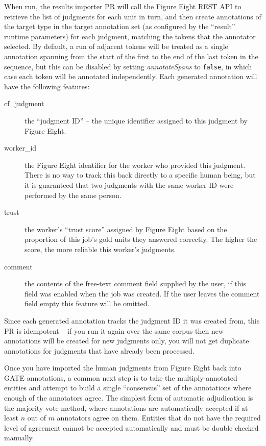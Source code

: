 When run, the results importer PR will call the Figure Eight REST API to
retrieve the list of judgments for each unit in turn, and then create
annotations of the target type in the target annotation set (as configured by
the ``result'' runtime parameters) for each judgment, matching the tokens that
the annotator selected.  By default, a run of adjacent tokens will be treated
as a single annotation spanning from the start of the first to the end of the
last token in the sequence, but this can be disabled by setting
\emph{annotateSpans} to \verb!false!, in which case each token will be
annotated independently.  Each generated annotation will have the following
features:
\begin{description}
\item[cf\_judgment] the ``judgment ID'' -- the unique identifier assigned to
  this judgment by Figure Eight.
\item[worker\_id] the Figure Eight identifier for the worker who provided this
  judgment.  There is no way to track this back directly to a specific human
  being, but it is guaranteed that two judgments with the same worker ID were
  performed by the same person.
\item[trust] the worker's ``trust score'' assigned by Figure Eight based on the
  proportion of this job's gold units they answered correctly.  The higher the
  score, the more reliable this worker's judgments.
\item[comment] the contents of the free-text comment field supplied by the
  user, if this field was enabled when the job was created.  If the user leaves
  the comment field empty this feature will be omitted.
\end{description}

Since each generated annotation tracks the judgment ID it was created from,
this PR is idempotent -- if you run it again over the same corpus then new
annotations will be created for new judgments only, you will not get duplicate
annotations for judgments that have already been processed.


Once you have imported the human judgments from Figure Eight back into GATE
annotations, a common next step is to take the multiply-annotated entities and
attempt to build a single ``consensus'' set of the annotations where enough
of the annotators agree.  The simplest form of automatic adjudication is the
majority-vote method, where annotations are automatically accepted if at
least $n$ out of $m$ annotators agree on them.  Entities that do not have the
required level of agreement cannot be accepted automatically and must be double
checked manually.


